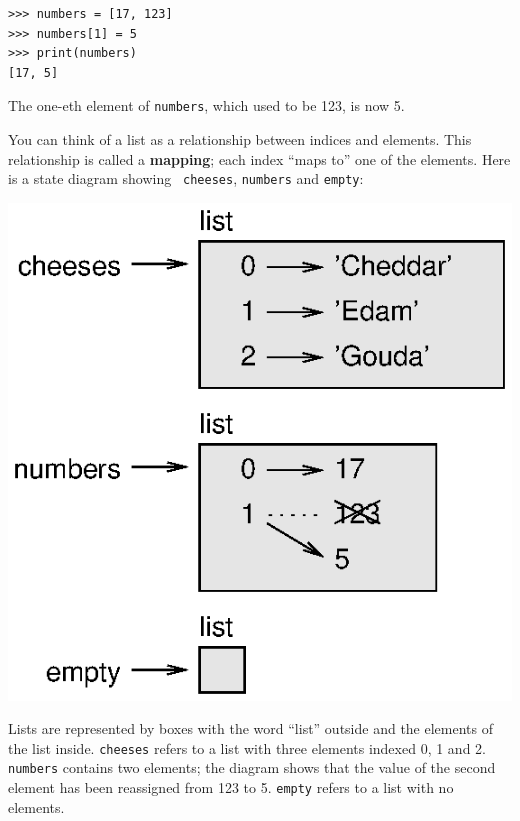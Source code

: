 \documentclass[10pt]{book}
\begin{document}

\beforeverb
\begin{verbatim}
>>> numbers = [17, 123]
>>> numbers[1] = 5
>>> print(numbers)
[17, 5]
\end{verbatim}
\afterverb
%
The one-eth element of {\tt numbers}, which
used to be 123, is now 5.


You can think of a list as a relationship between indices and
elements.  This relationship is called a {\bf mapping}; each index
``maps to'' one of the elements.  Here is a state diagram showing {\tt
cheeses}, {\tt numbers} and {\tt empty}:


\beforefig
\centerline{\includegraphics{figs/list_state.eps}}
\afterfig

Lists are represented by boxes with the word ``list'' outside
and the elements of the list inside.  {\tt cheeses} refers to
a list with three elements indexed 0, 1 and 2.
{\tt numbers} contains two elements; the diagram shows that the
value of the second element has been reassigned from 123 to 5.
{\tt empty} refers to a list with no elements.

\end{document}
